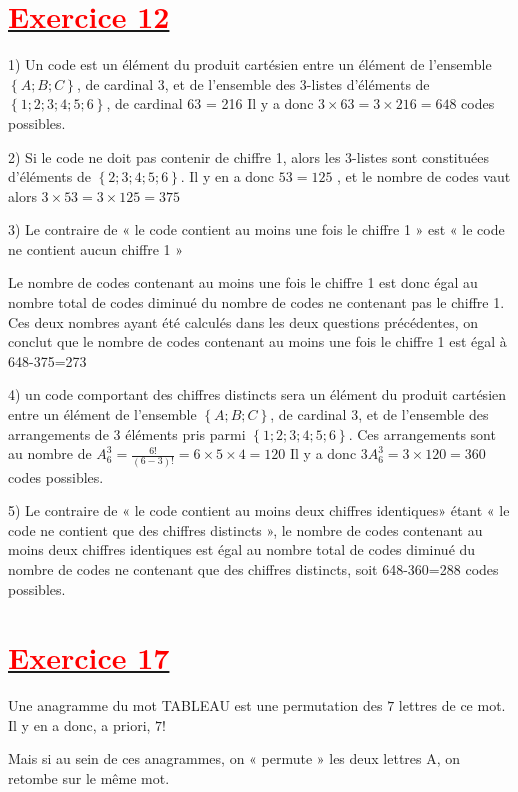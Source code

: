 \documentclass[12pt]{article}
\begin{document}
\section*{\underline{\textbf{\textcolor{red}{Exercice 12}}}}
1) Un code est un élément du produit cartésien entre un élément de l’ensemble $\left\lbrace A ;B ;C\right\rbrace $, de cardinal 3, et de l’ensemble
des 3-listes d’éléments de $\left\lbrace 1 ;2 ;3 ;4 ;5 ;6\right\rbrace $, de cardinal 63 = 216
Il y a donc $3 \times 63 = 3 \times 216 = 648$ codes possibles.

2) Si le code ne doit pas contenir de chiffre 1, alors les 3-listes sont constituées d’éléments de $\left\lbrace 2 ;3 ;4 ;5 ;6\right\rbrace $. Il y en a donc $53 = 125$ , et le nombre de codes vaut alors $3 \times 53 = 3 \times 125 = 375$

3) Le contraire de « le code contient au moins une fois le chiffre 1 » est « le code ne contient aucun chiffre 1 »

Le nombre de codes contenant au moins une fois le chiffre 1 est donc égal au nombre total de codes diminué du nombre
de codes ne contenant pas le chiffre 1. Ces deux nombres ayant été calculés dans les deux questions précédentes, on
conclut que le nombre de codes contenant au moins une fois le chiffre 1 est égal à 648-375=273

4) un code comportant des chiffres distincts sera un élément du produit cartésien entre un élément de l’ensemble $\left\lbrace A ;B ;C\right\rbrace $, de cardinal 3, et de l’ensemble des arrangements de 3 éléments pris parmi $\left\lbrace 1 ;2 ;3 ;4 ;5 ;6\right\rbrace $. Ces arrangements sont au nombre de 
$A_{6}^{3}=\frac{6!}{(6-3)!}=6 \times 5 \times 4 = 120$ Il y a donc $3A_{6}^{3}=3\times120=360$ codes possibles.

5) Le contraire de « le code contient au moins deux chiffres identiques» étant « le code ne contient que des chiffres
distincts », le nombre de codes contenant au moins deux chiffres identiques est égal au nombre total de codes diminué du
nombre de codes ne contenant que des chiffres distincts, soit 648-360=288 codes possibles.
\section*{\underline{\textbf{\textcolor{red}{Exercice 17}}}}
Une anagramme du mot TABLEAU est une permutation des $7$ lettres de ce mot. Il y en a donc, a priori, $7 !$

Mais si au sein de ces anagrammes, on « permute » les deux lettres A, on retombe sur le même mot.
\end{document}
